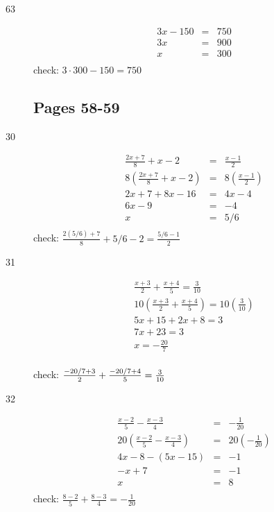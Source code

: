 \documentclass{exam}
\begin{document}
\begin{description}
\item[63]
\begin{eqnarray*}
  3x - 150 & = & 750 \\
  3x & = & 900 \\
  x & = & 300 \\
\end{eqnarray*}
check: \(3 \cdot 300 - 150 = 750\)

\subsection{Pages 58-59}

\item[30]
\begin{eqnarray*}
  \frac{2x + 7}{8} + x - 2 & = & \frac{x-1}{2} \\
  8 \left( \frac{2x + 7}{8} + x - 2 \right) & = & 8 \left( \frac{x-1}{2} \right) \\
  2x + 7 + 8x - 16 & = & 4x - 4 \\
  6x - 9 & = & -4 \\
  x & = & 5/6 \\
\end{eqnarray*}
check: \( \frac{2(5/6) + 7}{8} + 5/6 - 2 = \frac{5/6 - 1}{2} \)

\item[31]
\begin{eqnarray*}
  \frac{x + 3}{2} + \frac{x + 4}{5} = \frac{3}{10} \\
  10 \left( \frac{x + 3}{2} + \frac{x + 4}{5} \right) = 10 \left( \frac{3}{10} \right) \\
  5x + 15 + 2x + 8 = 3 \\
  7x + 23 = 3 \\
  x = -\frac{20}{7} \\
\end{eqnarray*}

check: \( \frac{-20/7 + 3}{2} + \frac{-20/7 + 4}{5} = \frac{3}{10} \\\)

\item[32]
\begin{eqnarray*}
  \frac{x - 2}{5} - \frac{x - 3}{4} & = & -\frac{1}{20} \\
  20(\frac{x - 2}{5} - \frac{x - 3}{4}) & = & 20(-\frac{1}{20}) \\
  4x - 8 - (5x - 15) & = & -1 \\
  -x + 7 & = & -1 \\
  x & = & 8 \\
\end{eqnarray*}
check: \( \frac{8 - 2}{5} + \frac{8 - 3}{4} =  -\frac{1}{20} \)



\end{description}
\end{document}
